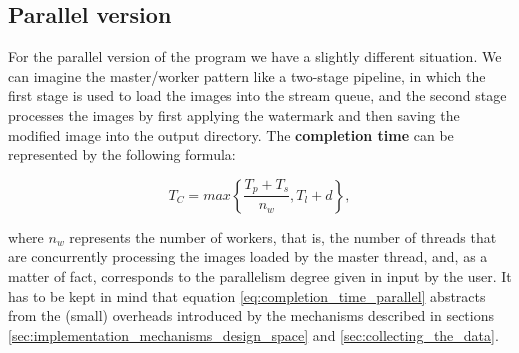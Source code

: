         \subsection{Parallel version} %
        \label{sub:parallel_version}
            For the parallel version of the program we have a slightly different situation. We can imagine the
            master/worker pattern like a two-stage pipeline, in which the first stage is used to load the images
            into the stream queue, and the second stage processes the images by first applying the watermark and
            then saving the modified image into the output directory. The \textbf{completion time} can be
            represented by the following formula:

            \begin{equation}
                T_C = \mathit{max} \left \{ \frac{T_p + T_s}{n_w}, T_l + d \right \},
                \label{eq:completion_time_parallel}
            \end{equation}

            where $n_w$ represents the number of workers, that is, the number of threads that are concurrently
            processing the images loaded by the master thread, and, as a mat{}ter of fact, corresponds to the
            parallelism degree given in input by the user. It has to be kept in mind that equation
            \ref{eq:completion_time_parallel} abstracts from the (small) overheads introduced by the
            mechanisms described in sections \ref{sec:implementation_mechanisms_design_space} and
            \ref{sec:collecting_the_data}.

